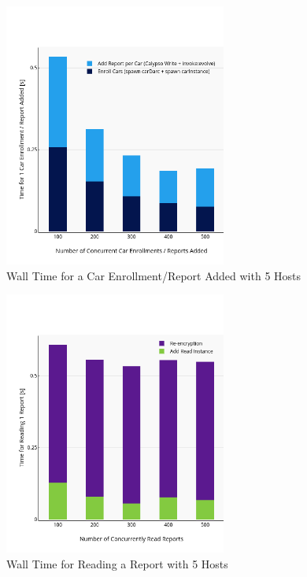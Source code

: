 \begin{figure}[H]
    \centering
    \includegraphics[width=0.65\textwidth, heigth=0.65\textwidth]{Sim/Wall-Time-Txns-Enroll.png}
    \vspace{-18pt}
    \caption{Wall Time for a Car Enrollment/Report Added with 5 Hosts}
    \label{Wall Time Txns Enroll}
\end{figure}
\begin{figure}[H]
    \centering
    \includegraphics[width=0.65\textwidth, heigth=0.65\textwidth]{Sim/Wall-Time-Txns-Read.png}
    \vspace{-18pt}
    \caption{Wall Time for Reading a Report with 5 Hosts}
    \label{Wall Time Txns Read}
\end{figure}
